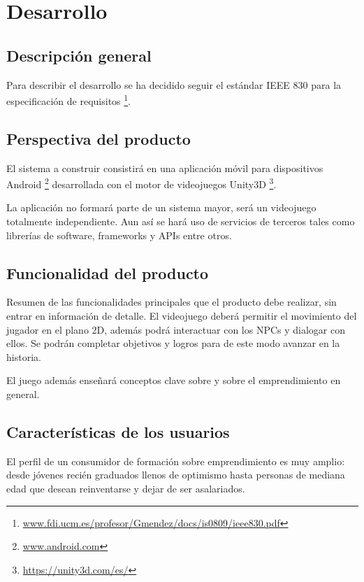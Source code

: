 \chapter{Desarrollo}

\section{Descripción general}

Para describir el desarrollo se ha decidido seguir el estándar IEEE 830 para la especificación de requisitos \footnote{\url{www.fdi.ucm.es/profesor/Gmendez/docs/is0809/ieee830.pdf}}.

\section{Perspectiva del producto}

El sistema a construir consistirá en una aplicación móvil para dispositivos Android \footnote{\url{www.android.com}} desarrollada con el motor de videojuegos Unity3D \footnote{\url{https://unity3d.com/es/}}. 

La aplicación no formará parte de un sistema mayor, será un videojuego totalmente independiente. Aun así se hará uso de servicios de terceros tales como librerías de software, frameworks y APIs entre otros.

\section{Funcionalidad del producto}

Resumen de las funcionalidades principales que el producto debe realizar, sin entrar en información de detalle.
El videojuego deberá permitir el movimiento del jugador en el plano 2D, además podrá interactuar con los NPCs y dialogar con ellos. Se podrán completar objetivos y logros para de este modo avanzar en la historia.

El juego además enseñará conceptos clave sobre  y sobre el emprendimiento en general.

\section{Características de los usuarios}

El perfil de un consumidor de formación sobre emprendimiento es muy amplio: desde jóvenes recién graduados llenos de optimismo hasta personas de mediana edad que desean reinventarse y dejar de ser asalariados. 

